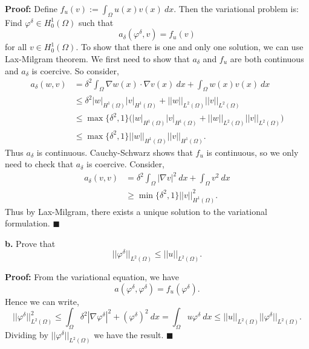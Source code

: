 \documentclass[11pt]{article}
\begin{document}
\vskip 1cm 


\textbf{Proof:} Define $f_u(v) := \int_\Omega u(x) v(x) \: dx$.
Then the variational problem is: Find $\varphi^\delta \in H^1_0(\Omega)$  such that 
\begin{equation*}
    a_\delta(\varphi^\delta, v) = f_u(v)
\end{equation*}
for all $v \in H^1_0(\Omega)$.
To show that there is one and only one solution, we can use Lax-Milgram theorem.
We first need to show that $a_\delta$ and $f_u$ are both continuous and $a_\delta$ is coercive.
So consider,
\begin{align*}
    a_\delta(w,v) &= \delta^2 \int_\Omega \nabla w(x) \cdot \nabla v(x) \: dx + \int_\Omega w(x) v(x) \: dx \\ 
    &\leq \delta^2 |w|_{H^1(\Omega)} |v|_{H^1(\Omega)} + ||w||_{L^2(\Omega)} ||v||_{L^2(\Omega)} \\
    &\leq \max\{ \delta^2, 1 \} \big( |w|_{H^1(\Omega)} |v|_{H^1(\Omega)} + ||w ||_{L^2(\Omega)} ||v||_{L^2(\Omega)}  \big)  \\
    &\leq \max\{ \delta^2, 1\} ||w||_{H^1(\Omega)} ||v||_{H^1(\Omega)}.
\end{align*}
Thus $a_\delta$ is continuous.
Cauchy-Schwarz shows that $f_u$ is continuous, so we only need to check that $a_\delta$ is coercive.
Consider,
\begin{align*}
    a_\delta(v,v) &= \delta^2 \int_\Omega |\nabla v|^2 \: dx + \int_\Omega v^2 \: dx \\ 
    &\geq \min\{\delta^2, 1\} ||v||^2_{H^1(\Omega)}.
\end{align*}
Thus by Lax-Milgram, there exists a unique solution to the variational formulation.
$\blacksquare$


\vskip 2cm


\textbf{b.} Prove that 
\begin{equation}
    ||\varphi^\delta||_{L^2(\Omega)} \leq ||u||_{L^2(\Omega)}.
\end{equation}


\vskip 1cm


\textbf{Proof:} From the variational equation, we have \begin{equation*}
	a(\varphi^\delta, \varphi^\delta) = f_u(\varphi^\delta).
\end{equation*}
Hence we can write,
\begin{equation*}
    ||\varphi^\delta||^2_{L^2(\Omega)} \leq \int_\Omega \delta^2 |\nabla \varphi^\delta|^2 + (\varphi^\delta)^2 \: dx = \int_\Omega u \varphi^\delta \: dx \leq ||u||_{L^2(\Omega)} ||\varphi^\delta||_{L^2(\Omega)}.
\end{equation*}
Dividing by $||\varphi^\delta||_{L^2(\Omega)}$ we have the result. $\blacksquare$
\end{document}
